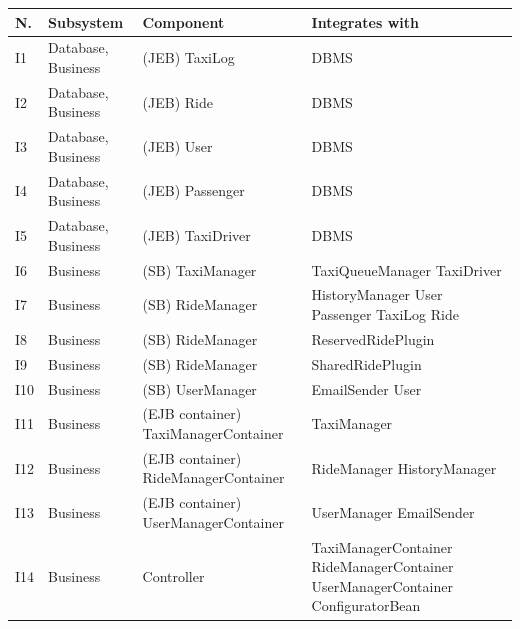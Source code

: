 \begin{table}
    \centering
    \begin{small}
    \begin{tabular}{| l | l | p{} | p{} |}
    \hline
    \textbf{N.} & \textbf{Subsystem} & \textbf{Component} & \textbf{Integrates with} \\
    \hline
    I1 & Database, Business & (JEB) TaxiLog & DBMS\\
    \hline
    I2 & Database, Business & (JEB)  Ride & DBMS\\
    \hline
    I3 & Database, Business & (JEB) User & DBMS\\
    \hline
    I4 & Database, Business & (JEB) Passenger & DBMS\\
    \hline
    I5 & Database, Business & (JEB) TaxiDriver & DBMS\\
    \hline
    I6 & Business & (SB) TaxiManager & TaxiQueueManager \newline TaxiDriver\\
    \hline
    I7 & Business & (SB) RideManager & HistoryManager \newline User \newline Passenger \newline TaxiLog \newline Ride\\
    \hline
    I8 & Business & (SB) RideManager & ReservedRidePlugin\\
    \hline
    I9 & Business & (SB) RideManager & SharedRidePlugin\\
    \hline
    I10  & Business & (SB) UserManager & EmailSender \newline User\\
    \hline
    I11  & Business & (EJB container) TaxiManagerContainer & TaxiManager\\
    \hline
    I12  & Business & (EJB container) RideManagerContainer & RideManager \newline HistoryManager\\
    \hline
    I13  & Business & (EJB container) UserManagerContainer & UserManager \newline EmailSender\\
    \hline
    I14  & Business & Controller & TaxiManagerContainer \newline RideManagerContainer \newline UserManagerContainer \newline ConfiguratorBean\\
    \hline

\end{tabular}
\end{small}
\end{table}

